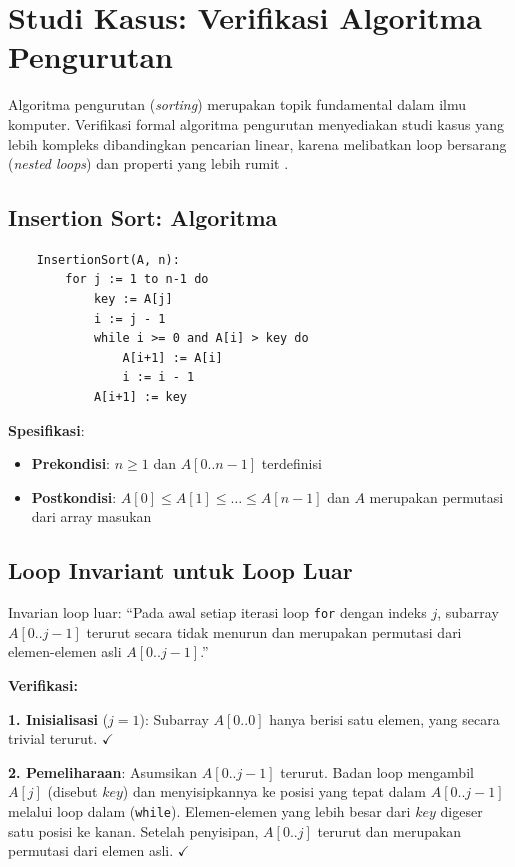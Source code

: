 \section{Studi Kasus: Verifikasi Algoritma Pengurutan}

Algoritma pengurutan (\textit{sorting}) merupakan topik fundamental dalam ilmu komputer. Verifikasi formal algoritma pengurutan menyediakan studi kasus yang lebih kompleks dibandingkan pencarian linear, karena melibatkan loop bersarang (\textit{nested loops}) dan properti yang lebih rumit \cite{rosen2019}.

\subsection{Insertion Sort: Algoritma}

\begin{verbatim}
    InsertionSort(A, n):
        for j := 1 to n-1 do
            key := A[j]
            i := j - 1
            while i >= 0 and A[i] > key do
                A[i+1] := A[i]
                i := i - 1
            A[i+1] := key
\end{verbatim}

\textbf{Spesifikasi}:
\begin{itemize}
    \item \textbf{Prekondisi}: $n \geq 1$ dan $A[0..n-1]$ terdefinisi
    \item \textbf{Postkondisi}: $A[0] \leq A[1] \leq \ldots \leq A[n-1]$ dan $A$ merupakan permutasi dari array masukan
\end{itemize}

\subsection{Loop Invariant untuk Loop Luar}

\begin{definisi}
Invarian loop luar: ``Pada awal setiap iterasi loop \texttt{for} dengan indeks $j$, subarray $A[0..j-1]$ terurut secara tidak menurun dan merupakan permutasi dari elemen-elemen asli $A[0..j-1]$.''
\end{definisi}

\textbf{Verifikasi:}

\textbf{1. Inisialisasi} ($j = 1$): Subarray $A[0..0]$ hanya berisi satu elemen, yang secara trivial terurut. $\checkmark$

\textbf{2. Pemeliharaan}: Asumsikan $A[0..j-1]$ terurut. Badan loop mengambil $A[j]$ (disebut $key$) dan menyisipkannya ke posisi yang tepat dalam $A[0..j-1]$ melalui loop dalam (\texttt{while}). Elemen-elemen yang lebih besar dari $key$ digeser satu posisi ke kanan. Setelah penyisipan, $A[0..j]$ terurut dan merupakan permutasi dari elemen asli. $\checkmark$

